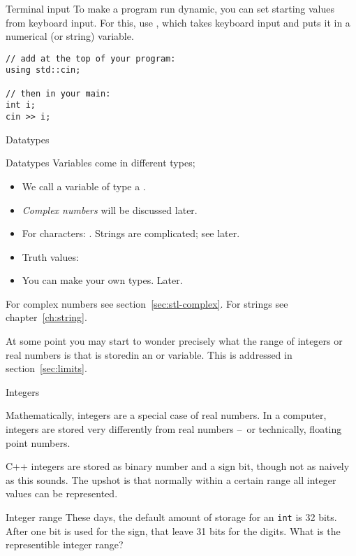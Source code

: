 \begin{block}{Terminal input}
  \label{sl:cin}
  To make a program run dynamic, you can set starting values from
  keyboard input. For this, use , which takes
  keyboard input and puts it in a numerical (or string) variable.
\begin{lstlisting}
// add at the top of your program:
using std::cin;

// then in your main:
int i;
cin >> i;
\end{lstlisting}
\end{block}

 {Datatypes}
\label{sec:ctypes}

\begin{block}{Datatypes}
  \label{sl:datatypes}
  Variables come in different types;
  \begin{itemize}
  \item We call a variable of type
     a .
  \item \emph{Complex numbers} will be
    discussed later.
  \item 
    For characters: . Strings are complicated; see later.
  \item Truth values: 
  \item 
    You can make your own types. Later.
  \end{itemize}
\end{block}

For complex numbers see section~\ref{sec:stl-complex}.
For strings see chapter~\ref{ch:string}.

At some point you may start to wonder precisely what the range of
integers or real numbers is that is storedin an  or 
variable. This is addressed in section~\ref{sec:limits}.

 {Integers}

Mathematically, integers are a special case of real numbers.
In a computer, integers are stored very differently from
real numbers --~or technically, floating point numbers.

C++ integers are stored as binary number and a sign bit, though not as
naively as this sounds. The upshot is that normally
 within a certain range all integer values can be represented.

\begin{exercise}{Integer range}
  \label{ex:int-range}
  These days, the default amount of storage for an \lstinline{int} is
  32 bits. After one bit is used for the sign, that leave 31 bits for
  the digits. What is the representible integer range?
\end{exercise}

